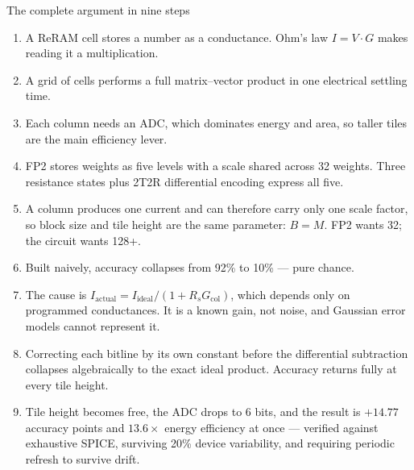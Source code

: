 \documentclass[11pt,a4paper]{report}
\begin{document}
\begin{keybox}{The complete argument in nine steps}
\begin{enumerate}[leftmargin=1.4em,itemsep=3pt]
  \item A ReRAM cell stores a number as a conductance. Ohm's law
        $I = V\!\cdot\!G$ makes reading it a multiplication.
  \item A grid of cells performs a full matrix--vector product in one
        electrical settling time.
  \item Each column needs an ADC, which dominates energy and area, so taller
        tiles are the main efficiency lever.
  \item FP2 stores weights as five levels with a scale shared across 32
        weights. Three resistance states plus 2T2R differential encoding
        express all five.
  \item A column produces one current and can therefore carry only one scale
        factor, so block size and tile height are the same parameter:
        $B = M$. FP2 wants 32; the circuit wants 128+.
  \item Built naively, accuracy collapses from 92\% to 10\% --- pure chance.
  \item The cause is $I_{\text{actual}} = I_{\text{ideal}}/(1 + R_s
        G_{\mathrm{col}})$, which depends only on programmed conductances.
        It is a known gain, not noise, and Gaussian error models cannot
        represent it.
  \item Correcting each bitline by its own constant before the differential
        subtraction collapses algebraically to the exact ideal product.
        Accuracy returns fully at every tile height.
  \item Tile height becomes free, the ADC drops to 6 bits, and the result is
        $+14.77$ accuracy points and $13.6\times$ energy efficiency at once ---
        verified against exhaustive SPICE, surviving 20\% device variability,
        and requiring periodic refresh to survive drift.
\end{enumerate}
\end{keybox}

\vspace{1em}
\end{document}
